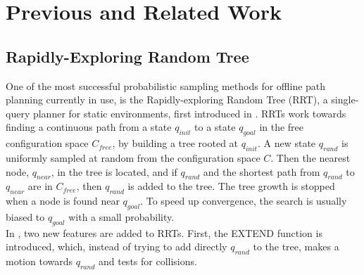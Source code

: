 \documentclass[10pt, conference, compsoc]{IEEEtran}
\begin{document}
\section{Previous and Related Work}
\label{sec:stateofart}

\subsection{Rapidly-Exploring Random Tree}\label{sec:RRT}

One of the most successful probabilistic sampling methods for offline path planning
currently in use, is the Rapidly-exploring Random Tree (RRT), a single-query planner for
static environments, first introduced in
\cite{Lavalle98}. RRTs work towards finding a continuous path from a state
$q_{init}$ to a state $q_{goal}$ in the free configuration space $C_{free}$, by
building a tree rooted at $q_{init}$. A new state $q_{rand}$ is uniformly
sampled at random from the configuration space $C$. Then the nearest node,
$q_{near}$, in
the tree is located, and if $q_{rand}$ and the shortest path from $q_{rand}$ to
$q_{near}$ are in $C_{free}$, then $q_{rand}$ is added to the tree.
The tree
growth is stopped when a node is found near $q_{goal}$. To speed up convergence,
the search is usually biased to $q_{goal}$ with a small probability.\\
In \cite{Kuffner00}, two new features are added to RRTs. First, the EXTEND
function %
is introduced, which, instead of trying
to add directly $q_{rand}$ to
the tree, makes a motion towards $q_{rand}$ and tests for collisions.
\end{document}
